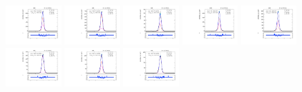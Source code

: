 \begin{figure}[htb]
\includegraphics[width=0.19\textwidth]{plots/Appendix_Recoil_Fits/ZmmData_PF_5TeV_2G_bkg/pfu2fit_8.pdf}
\includegraphics[width=0.19\textwidth]{plots/Appendix_Recoil_Fits/ZmmData_PF_5TeV_2G_bkg/pfu2fit_9.pdf}
\includegraphics[width=0.19\textwidth]{plots/Appendix_Recoil_Fits/ZmmData_PF_5TeV_2G_bkg/pfu2fit_19.pdf}
\includegraphics[width=0.19\textwidth]{plots/Appendix_Recoil_Fits/ZmmData_PF_5TeV_2G_bkg/pfu2fit_11.pdf}
\includegraphics[width=0.19\textwidth]{plots/Appendix_Recoil_Fits/ZmmData_PF_5TeV_2G_bkg/pfu2fit_12.pdf}
\includegraphics[width=0.19\textwidth]{plots/Appendix_Recoil_Fits/ZmmData_PF_5TeV_2G_bkg/pfu2fit_13.pdf}
\includegraphics[width=0.19\textwidth]{plots/Appendix_Recoil_Fits/ZmmData_PF_5TeV_2G_bkg/pfu2fit_14.pdf}
\includegraphics[width=0.19\textwidth]{plots/Appendix_Recoil_Fits/ZmmData_PF_5TeV_2G_bkg/pfu2fit_15.pdf}

\end{figure}
